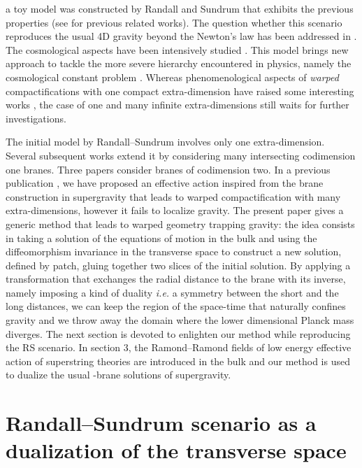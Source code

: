 \documentclass[a4paper,12pt]{article}
\begin{document}
a toy model was constructed by Randall and Sundrum that
exhibits the previous properties (see \cite{beforeRS} for previous related works).
The question whether this scenario reproduces
the usual 4D gravity beyond the Newton's law has been addressed in
\cite{RSGravity}. The cosmological aspects have been intensively studied
\cite{RSCosmo}. This model brings new approach to tackle the more
severe hierarchy encountered in physics, namely the cosmological constant problem
\cite{CsteCosmo, CGS3}. Whereas phenomenological aspects of {\it warped} compactifications
with one compact extra-dimension have raised some interesting works \cite{RSpheno},
the case of one and many infinite extra-dimensions still waits for further investigations.

The initial model by Randall--Sundrum involves only one extra-dimension. Several
subsequent works \cite{intersections} extend it by considering many intersecting
codimension one branes. Three papers \cite{TwoExtra} consider branes of codimension two.
In a previous publication \cite{CGS3}, we have proposed an effective action inspired
from the brane construction in supergravity that leads to warped compactification
with many extra-dimensions, however it fails to localize gravity. The present paper
gives a generic method that leads to warped geometry trapping gravity: the idea
consists in taking a solution of the equations of motion in the bulk and using
the diffeomorphism invariance in the transverse space to construct a new solution,
defined by patch, gluing together two slices of the initial solution. By
applying a transformation that exchanges the radial distance to the brane with its
inverse, namely imposing a kind of \coordHE{} duality {\it i.e.} a symmetry between
the short and the long distances, we can keep the region of the space-time
that naturally confines gravity and we throw away the domain where the lower
dimensional Planck mass diverges. The next section is devoted to enlighten
our method while reproducing the RS scenario. In section 3, the Ramond--Ramond
fields of low energy effective action of superstring theories are introduced in the
bulk and our method is used to \coordHE{} dualize the usual \coordHE{}-brane solutions of
supergravity.

\section{Randall--Sundrum scenario as a \coordHE{} dualization of the transverse space}
\end{document}
